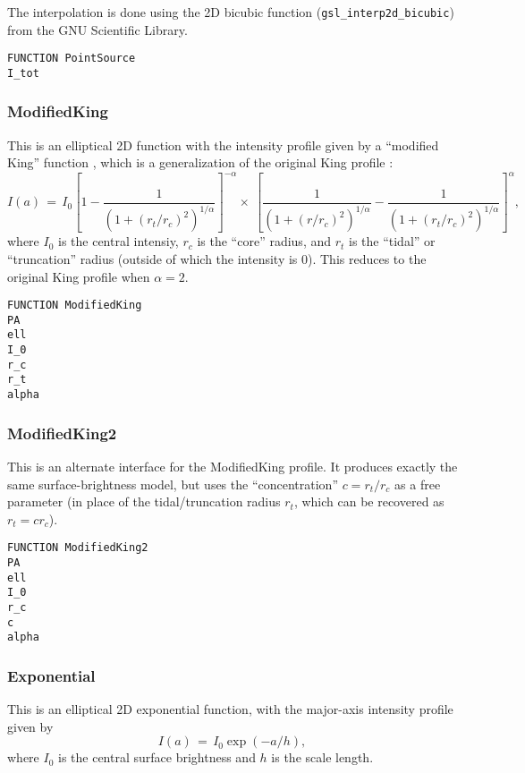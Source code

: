 \documentclass[10pt,a4paper,article]{memoir}
\begin{document}
The interpolation is done using the 2D bicubic function
(\texttt{gsl\_interp2d\_bicubic}) from the GNU Scientific Library.

\begin{verbatim}
FUNCTION PointSource
I_tot
\end{verbatim}


\subsubsection{ModifiedKing}

This is an elliptical 2D function with the intensity profile given by a 
``modified King'' function \citep{elson99,peng10}, which is a generalization
of the original King profile \citep{king62}:
\begin{equation}
I(a) \, = \, I_{0} \left[1 - \frac{1}{(1 + (r_{t}/r_{c})^{2})^{1/\alpha}} \right]^{-\alpha}
  \times \: \left[ \frac{1}{(1 + (r/r_{c})^{2})^{1/\alpha}} - 
  \frac{1}{(1 + (r_{t}/r_{c})^{2})^{1/\alpha}} \right]^{\alpha},
\end{equation}
where $I_{0}$ is the central intensiy, $r_{c}$ is the ``core'' radius,
and $r_{t}$ is the ``tidal'' or ``truncation'' radius (outside of which
the intensity is 0).
This reduces to the original King profile when $\alpha = 2$.

\begin{verbatim}
FUNCTION ModifiedKing
PA
ell
I_0
r_c
r_t
alpha
\end{verbatim}


\subsubsection{ModifiedKing2}

This is an alternate interface for the ModifiedKing profile. It produces
exactly the same surface-brightness model, but uses the
``concentration'' $c = r_t/r_c$ as a free parameter (in place of the
tidal/truncation radius $r_{t}$, which can be recovered as $r_{t} = c r_{c}$).

\begin{verbatim}
FUNCTION ModifiedKing2
PA
ell
I_0
r_c
c
alpha
\end{verbatim}




\subsubsection{Exponential}

This is an elliptical 2D exponential function, with the major-axis intensity
profile given by
\begin{equation}
I(a) \, = \, I_{0} \exp(-a/h),
\end{equation}
where $I_{0}$ is the central surface brightness and $h$ is the scale length.
\end{document}
